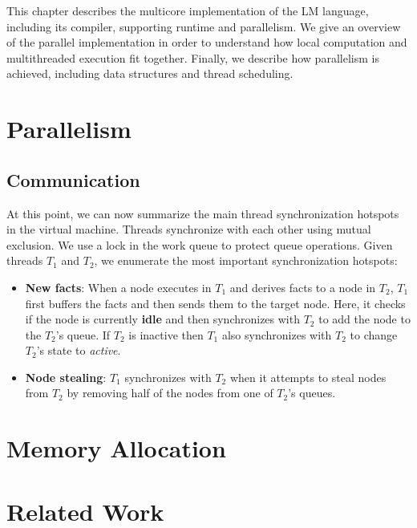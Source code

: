 This chapter describes the multicore implementation of the LM language,
including its compiler, supporting runtime and parallelism. We give an overview
of the parallel implementation in order to understand how local computation and
multithreaded execution fit together.  Finally, we describe how parallelism is
achieved, including data structures and thread scheduling.

\section{Parallelism}\label{sec:implementation:parallelism}


\subsection{Communication}

At this point, we can now summarize the main thread synchronization hotspots in the
virtual machine. Threads synchronize with each other using mutual exclusion. We
use a lock in the work queue to protect queue operations.  Given threads $T_1$
and $T_2$, we enumerate the most important synchronization hotspots:

\begin{itemize}

   \item \textbf{New facts}: When a node executes in $T_1$ and derives facts to
   a node in $T_2$, $T_1$ first buffers the facts and then sends them to the
   target node. Here, it checks if the node is currently \textbf{idle} and then
   synchronizes with $T_2$ to add the node to the $T_2$'s queue.  If $T_2$ is
   inactive  then $T_1$ also synchronizes with $T_2$ to change $T_2$'s state to
   \emph{active}.

   \item \textbf{Node stealing}: $T_1$ synchronizes with $T_2$ when it attempts
   to steal nodes from $T_2$ by removing half of the nodes from one of $T_2$'s
   queues.

\end{itemize}



\section{Memory Allocation}


\section{Related Work}



